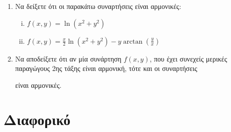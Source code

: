 \begin{enumerate}

    \item Να δείξετε ότι οι παρακάτω συναρτήσεις είναι αρμονικές:
        \begin{enumerate}[(i)]
            \item $f(x,y) = \ln(x^{2} + y^{2})$
            \item $ f(x,y) = \frac{ x }{ 2 } \ln(x^{2} + y^{2}) - y 
                \arctan(\frac{ y }{ x } ) $
        \end{enumerate}

    \item Να αποδείξετε ότι αν μία συνάρτηση $f(x,y)$, που έχει συνεχείς 
        μερικές παραγώγους 2ης τάξης είναι αρμονική, τότε και οι συναρτήσεις 
        είναι αρμονικές.
\end{enumerate}

\section{Διαφορικό}

